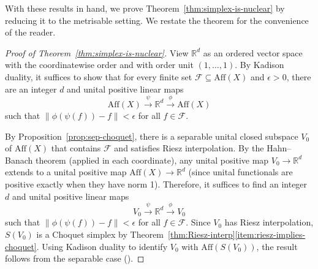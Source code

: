 \documentclass[a4paper,11pt]{amsart}
\theoremstyle{definition}
\numberwithin{equation}{section}
\numberwithin{theorem}{section}
\begin{document}
With these results in hand, we prove Theorem~\ref{thm:simplex-is-nuclear} by reducing it to the metrisable setting.  We restate the theorem for the convenience of the reader.

\simplexisnuclear*

\begin{proof}[Proof of Theorem~\ref{thm:simplex-is-nuclear}]
	View $\mathbb R^d$ as an ordered vector space with the coordinatewise order and with order unit $(1, \ldots, 1)$.  By Kadison duality, it suffices to show that for every finite set $\mathcal F \subseteq \mathrm{Aff}(X)$ and $\epsilon > 0$, there are an integer $d$ and unital positive linear maps 
	\begin{equation}
		\mathrm{Aff}(X) \overset\psi\longrightarrow \mathbb R^{d} \overset\phi\longrightarrow \mathrm{Aff}(X)
	\end{equation}
	such that $\|\phi(\psi(f)) - f\| < \epsilon$ for all $f \in \mathcal F$.
	
	By Proposition~\ref{prop:sep-choquet}, there is a separable unital closed subspace $V_0$  of $\mathrm{Aff}(X)$ that contains $\mathcal F$ and satisfies Riesz interpolation.  By the Hahn--Banach theorem (applied in each coordinate), any unital positive map $V_0 \rightarrow \mathbb R^d$ extends to a unital positive map $\mathrm{Aff}(X) \rightarrow \mathbb R^d$ (since unital functionals are positive exactly when they have norm 1).  Therefore, it suffices to find an integer $d$ and unital positive linear maps
	\begin{equation}
		V_0 \overset\psi\longrightarrow \mathbb R^{d} \overset\phi\longrightarrow V_0
	\end{equation}
	such that $\|\phi(\psi(f)) - f\| < \epsilon$ for all $f \in \mathcal F$.  Since $V_0$ has Riesz interpolation, $S(V_0)$ is a Choquet simplex by Theorem~\ref{thm:Riesz-interp}\ref{item:riesz-implies-choquet}.  Using Kadison duality to identify $V_0$ with $\mathrm{Aff}(S(V_0))$, the result follows from the separable case (\cite[Lemma~2.8]{Elliott-Niu15}).
\end{proof}
\end{document}
